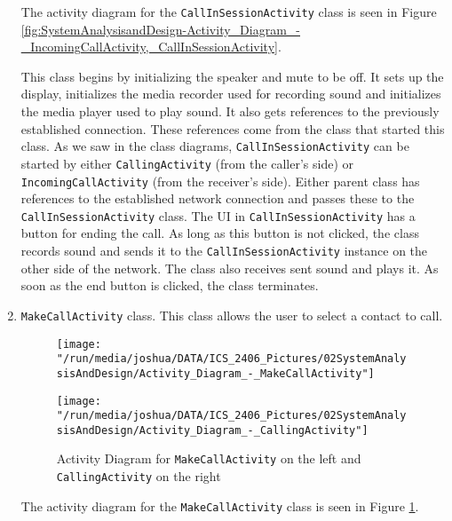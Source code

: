 \documentclass[12pt,svgnames,smaller]{article} %
\begin{document}
\begin{enumerate}
		The activity diagram for the \texttt{CallInSessionActivity} class is seen in Figure \ref{fig:SystemAnalysisandDesign-Activity_Diagram_-_IncomingCallActivity,_CallInSessionActivity}.
		
		This class begins by initializing the speaker and mute to be off. It sets up the display, initializes the media recorder used for recording sound and initializes the media player used to play sound. It also gets references to the previously established connection. These references come from the class that started this class. As we saw in the class diagrams, \texttt{CallInSessionActivity} can be started by either \texttt{CallingActivity} (from the caller's side) or \texttt{IncomingCallActivity} (from the receiver's side). Either parent class has references to the established network connection and passes these to the \texttt{CallInSessionActivity} class. The UI in \texttt{CallInSessionActivity} has a button for ending the call. As long as this button is not clicked, the class records sound and sends it to the \texttt{CallInSessionActivity} instance on the other side of the network. The class also receives sent sound and plays it. As soon as the end button is clicked, the class terminates.
		
		\item \texttt{MakeCallActivity} class. This class allows the user to select a contact to call.
		
		\begin{figure}
			\centering
			\begin{minipage}{0.5\textwidth}
				\centering
				\texttt{[image: "/run/media/joshua/DATA/ICS\_2406\_Pictures/02SystemAnalysisAndDesign/Activity\_Diagram\_-\_MakeCallActivity"]}
			\end{minipage}%
			\begin{minipage}{0.5\textwidth}
				\centering
				\texttt{[image: "/run/media/joshua/DATA/ICS\_2406\_Pictures/02SystemAnalysisAndDesign/Activity\_Diagram\_-\_CallingActivity"]}
			\end{minipage}
			\caption{Activity Diagram for \texttt{MakeCallActivity} on the left and \texttt{CallingActivity} on the right}
			\label{fig:SystemAnalysisandDesign-Activity_Diagram_-_MakeCallActivity,_CallingActivity}		
		\end{figure}
		
		The activity diagram for the \texttt{MakeCallActivity} class is seen in Figure \ref{fig:SystemAnalysisandDesign-Activity_Diagram_-_MakeCallActivity,_CallingActivity}.
		

\end{enumerate}
\end{document}
